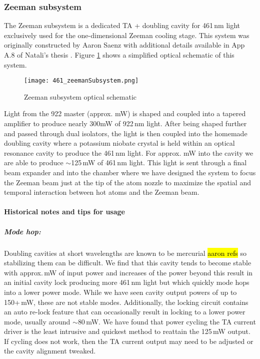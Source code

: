 \subsubsection{Zeeman subsystem}
The Zeeman subsystem is a dedicated TA + doubling cavity for 461\,nm light exclusively used for the one-dimensional Zeeman cooling stage.
This system was originally constructed by Aaron Saenz \cite{AaronDSaenz2005} with additional details available in App A.8 of Natali's thesis \cite{MartinezdeEscolar2010}.
Figure \ref{fig:zeemanSchematic} shows a simplified optical schematic of this system.
	\begin{figure} 
		\centerline{
		\texttt{[image: 461\_zeemanSubsystem.png]}}
		\caption{Zeeman subsystem optical schematic}
		\label{fig:zeemanSchematic}
	\end{figure}
Light from the 922 master (approx. mW) is shaped and coupled into a tapered amplifier to produce nearly 300\;mW of 922\,nm light.
After being shaped further and passed through dual isolators, the light is then coupled into the homemade doubling cavity where a potassium niobate crystal is held within an optical resonance cavity to produce the 461\,nm light.
For approx. mW into the cavity we are able to produce $\sim$125\,mW of 461\,nm light.
This light is sent through a final beam expander and into the chamber where we have designed the system to focus the Zeeman beam just at the tip of the atom nozzle to maximize the spatial and temporal interaction between hot atoms and the Zeeman beam.

\paragraph{Historical notes and tips for usage}
\subparagraph{Mode hop:} 
Doubling cavities at short wavelengths are known to be mercurial \hl{aaron refs} so stabilizing them can be difficult. 
We find that this cavity tends to become stable with approx.\,mW of input power and increases of the power beyond this result in an initial cavity lock producing more 461\,nm light but which quickly mode hops into a lower power mode.
While we have seen cavity output powers of up to 150+\,mW, these are not stable modes.
Additionally, the locking circuit contains an auto re-lock feature that can occasionally result in locking to a lower power mode, usually around $\sim$80\,mW.
We have found that power cycling the TA current driver is the least intrusive and quickest method to reattain the 125\,mW output.
If cycling does not work, then the TA current output may need to be adjusted or the cavity alignment tweaked.

